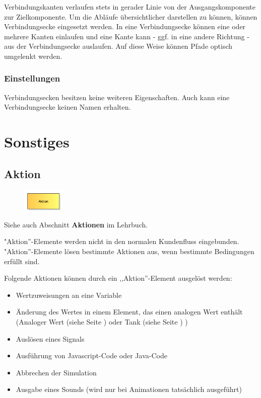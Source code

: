 Verbindungskanten verlaufen stets in gerader Linie von der Ausgangskomponente zur Zielkomponente.
Um die Abläufe übersichtlicher darstellen zu können, können Verbindungsecke eingesetzt werden. In eine Verbindungsecke können eine
oder mehrere Kanten einlaufen und eine Kante kann - ggf. in eine andere Richtung - aus der Verbindungsecke auslaufen. Auf diese Weise
können Pfade optisch umgelenkt werden.

\subsection*{Einstellungen}

Verbindungsecken besitzen keine weiteren Eigenschaften. Auch kann eine Verbindungsecke keinen Namen erhalten.





\chapter{Sonstiges}

\section{Aktion}
\label{ref:ModelElementAction}

\begin{figure}
\vspace{-22pt}
\includegraphics[width=2cm]{imageModelElementAction.png}
\vspace{-22pt}
\end{figure}

Siehe auch Abschnitt \textbf{Aktionen} im Lehrbuch.

"Aktion''-Elemente werden nicht in den normalen Kundenfluss eingebunden.
"Aktion''-Elemente lösen bestimmte Aktionen aus, wenn bestimmte Bedingungen erfüllt sind.

Folgende Aktionen können durch ein ,,Aktion''-Element ausgelöst werden:

\begin{itemize}
  \item Wertzuweisungen an eine Variable 
  \item Änderung des Wertes in einem Element, das einen analogen Wert enthält
  (Analoger Wert (siehe Seite \pageref{ref:ModelElementAnalogValue}) oder Tank (siehe Seite \pageref{ref:ModelElementTank}) )
  \item Auslösen eines Signals 
  \item Ausführung von Javascript-Code oder Java-Code 
  \item Abbrechen der Simulation 
  \item Ausgabe eines Sounds (wird nur bei Animationen tatsächlich ausgeführt) 
\end{itemize}

